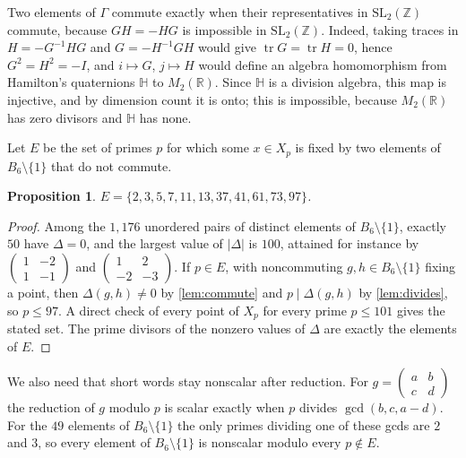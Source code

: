 \documentclass[11pt,a4paper]{article}
\numberwithin{equation}{section}
\newtheorem{proposition}[theorem]{Proposition}
\theoremstyle{remark}
\newcommand{\Z}{\mathbb Z}
\newcommand{\SL}{\mathrm{SL}}
\begin{document}
Two elements of $\Gamma$ commute exactly when their representatives in $\SL_2(\Z)$ commute, because $GH=-HG$ is impossible in $\SL_2(\Z)$. Indeed, taking traces in $H=-G^{-1}HG$ and $G=-H^{-1}GH$ would give $\operatorname{tr}G=\operatorname{tr}H=0$, hence $G^2=H^2=-I$, and $i\mapsto G$, $j\mapsto H$ would define an algebra homomorphism from Hamilton's quaternions $\mathbb H$ to $M_2(\mathbb R)$. Since $\mathbb H$ is a division algebra, this map is injective, and by dimension count it is onto; this is impossible, because $M_2(\mathbb R)$ has zero divisors and $\mathbb H$ has none.

Let $E$ be the set of primes $p$ for which some $x\in X_p$ is fixed by two elements of $B_6\setminus\{1\}$ that do not commute.

\begin{proposition}\label{prop:E}
$E=\{2,3,5,7,11,13,37,41,61,73,97\}$.
\end{proposition}

\begin{proof}
Among the $1{,}176$ unordered pairs of distinct elements of $B_6\setminus\{1\}$, exactly $50$ have $\Delta=0$, and the largest value of $|\Delta|$ is $100$, attained for instance by $\left(\begin{smallmatrix}1&-2\\1&-1\end{smallmatrix}\right)$ and $\left(\begin{smallmatrix}1&2\\-2&-3\end{smallmatrix}\right)$. If $p\in E$, with noncommuting $g,h\in B_6\setminus\{1\}$ fixing a point, then $\Delta(g,h)\ne0$ by \cref{lem:commute} and $p\mid\Delta(g,h)$ by \cref{lem:divides}, so $p\le 97$. A direct check of every point of $X_p$ for every prime $p\le 101$ gives the stated set. The prime divisors of the nonzero values of $\Delta$ are exactly the elements of $E$.
\end{proof}

We also need that short words stay nonscalar after reduction. For $g=\left(\begin{smallmatrix}a&b\\c&d\end{smallmatrix}\right)$ the reduction of $g$ modulo $p$ is scalar exactly when $p$ divides $\gcd(b,c,a-d)$. For the $49$ elements of $B_6\setminus\{1\}$ the only primes dividing one of these gcds are $2$ and $3$, so every element of $B_6\setminus\{1\}$ is nonscalar modulo every $p\notin E$.
\end{document}
